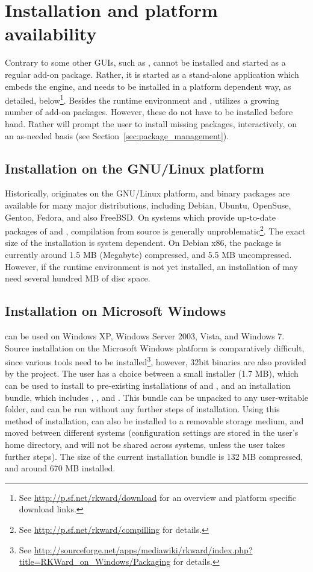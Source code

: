 \section{Installation and platform availability}
\label{sec:installing_starting_RKWard}
Contrary to some other  GUIs, such as ,  cannot be installed and started as a
regular  add-on package. Rather, it is started as a stand-alone application which embeds the
 engine, and needs to be installed in a platform dependent way, as detailed, below\footnote{
  See \url{http://p.sf.net/rkward/download} for an overview and platform specific download links.
}. Besides the
 runtime environment and ,  utilizes a growing number of  add-on packages.
However, these do not have to be installed before hand. Rather  will prompt the user to install
missing packages, interactively, on an as-needed basis (see Section~\ref{sec:package_management}).

\subsection{Installation on the GNU/Linux platform}
Historically,  originates on the GNU/Linux platform, and binary packages are available for many major
distributions, including Debian, Ubuntu, OpenSuse, Gentoo, Fedora, and also FreeBSD. On systems which
provide up-to-date packages of  and , compilation from source is generally unproblematic\footnote{
  See \url{http://p.sf.net/rkward/compilling} for details.
}. The exact size of the installation is system dependent. On Debian x86, the package is currently around 1.5 MB (Megabyte) compressed,
and 5.5 MB uncompressed. However, if the  runtime environment is not yet installed, an installation of  may
need several hundred MB of disc space.

\subsection{Installation on Microsoft Windows}
 can be used on Windows XP, Windows Server 2003, Vista, and Windows 7. Source installation on the
Microsoft Windows platform is comparatively difficult, since various tools need to be installed\footnote{
  See \url{http://sourceforge.net/apps/mediawiki/rkward/index.php?title=RKWard\_on\_Windows/Packaging} for details.
}, however, 32bit binaries are also provided by the project. The user has a choice between a small installer (1.7 MB),
which can be used to install  to pre-existing installations of  and , and an installation
bundle, which includes , , and . This bundle can be unpacked to any user-writable folder,
and can be run without any further steps of installation. Using this method of installation,
 can also be installed to a removable storage medium, and moved between different systems (configuration
settings are stored in the user's home directory, and will not be shared across systems, unless the user takes further steps).
The size of the current installation bundle is 132 MB compressed, and around 670 MB installed.

